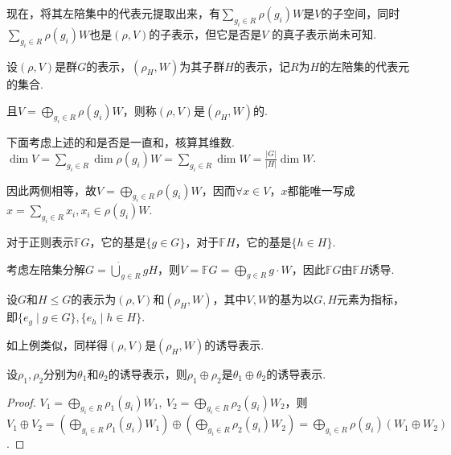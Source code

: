 现在，将其左陪集中的代表元提取出来，有$\sum_{g_i \in R} \rho(g_i)W$是$V$的子空间，同时$\sum_{g_i \in R} \rho(g_i)W$也是$(\rho, V)$的子表示，但它是否是$V$ 的真子表示尚未可知.\par

\begin{definition}[诱导表示]
    设$(\rho, V)$是群$G$的表示，$(\rho_H, W)$为其子群$H$的表示，记$R$为$H$的左陪集的代表元的集合.\par
    且$V = \bigoplus_{g_i \in R} \rho(g_i)W$，则称$(\rho, V)$是$(\rho_H, W)$的.
\end{definition}

下面考虑上述的和是否是一直和，核算其维数. $\dim V = \sum_{g_i \in R} \dim \rho(g_i)W = \sum_{g_i \in R} \dim W = \frac{|G|}{|H|} \dim W$.\par
因此两侧相等，故$V = \bigoplus_{g_i \in R} \rho(g_i)W$，因而$\forall x \in V$，$x$都能唯一写成$x = \sum_{g_i \in R} x_i, x_i \in \rho(g_i)W$.\par

\begin{instance}
    对于正则表示$\mathbb{F}G$，它的基是$\{g \in G\}$，对于$\mathbb{F}H$，它的基是$\{h \in H\}$.\par
    考虑左陪集分解$G = \dot{\bigcup}_{g \in R} gH$，则$V = \mathbb{F}G = \bigoplus_{g \in R} g \cdot W$，因此$\mathbb{F}G$由$\mathbb{F}H$诱导.
\end{instance}

\begin{instance}
    设$G$和$H \leqslant G$的表示为$(\rho, V)$和$(\rho_H, W)$，其中$V, W$的基为以$G, H$元素为指标，即$\{e_g \mid g \in G\}, \{e_h \mid h \in H\}$.\par
    如上例类似，同样得$(\rho, V)$是$(\rho_H, W)$的诱导表示.
\end{instance}

\begin{property}[直和和诱导可交换]
    设$\rho_1, \rho_2$分别为$\theta_1$和$\theta_2$的诱导表示，则$\rho_1 \oplus \rho_2$是$\theta_1 \oplus \theta_2$的诱导表示.
\end{property}

\begin{proof}
    $V_1 = \bigoplus_{g_i \in R} \rho_1(g_i) W_1,\ V_2 = \bigoplus_{g_i \in R} \rho_2(g_i) W_2$，则$V_1 \oplus V_2 = (\bigoplus_{g_i \in R} \rho_1(g_i) W_1) \oplus (\bigoplus_{g_i \in R} \rho_2(g_i) W_2) = \bigoplus_{g_i \in R} \rho(g_i) (W_1 \oplus W_2)$.
\end{proof}

